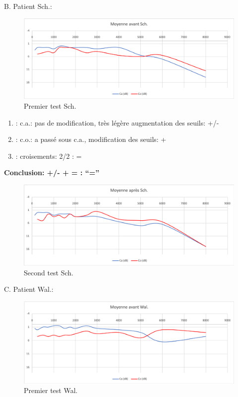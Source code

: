 B. Patient Sch.:

\begin{figure}
\centering
\includegraphics[width=0.7\linewidth]{images/graphiques/schaff_pre.png}
\caption[Moyenne OG+OD]{Premier test Sch.}
       
\label{groupecontroleimage1}
\end{figure}

	\begin{enumerate}
 		
 		\item : c.a.: pas de modification, très légère augmentation des
                  seuils: +/-
 		\item : c.o.: a passé sous c.a., modification des seuils: +
 		\item : croisements: 2/2 :     =
                  
                \end{enumerate}

              \textbf{  Conclusion:  +/-    +    =        : ``=''}

              \begin{figure}
\centering
\includegraphics[width=0.7\linewidth]{images/graphiques/schaff_post.png}
\caption[Moyenne OG+OD]{Second test Sch.}
       
\label{groupecontroleimage1}
\end{figure}

C. Patient Wal.:

\begin{figure}
\centering
\includegraphics[width=0.7\linewidth]{images/graphiques/wal_pre.png}
\caption[Moyenne OG+OD]{Premier test Wal.}
       
\label{groupecontroleimage1}
\end{figure}

